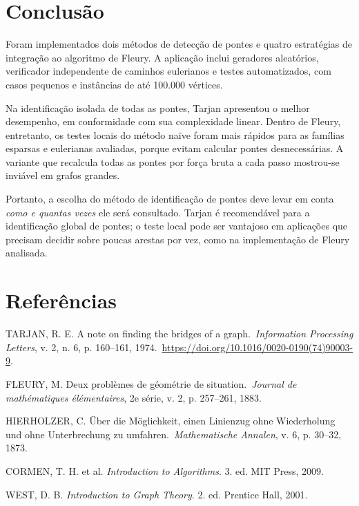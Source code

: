\documentclass[12pt,a4paper]{article}
\newcommand{\naive}{na\"ive}
\begin{document}
\section{Conclusão}
Foram implementados dois métodos de detecção de pontes e quatro
estratégias de integração ao algoritmo de Fleury. A aplicação inclui
geradores aleatórios, verificador independente de caminhos eulerianos
e testes automatizados, com casos pequenos e instâncias de até
100.000 vértices.

Na identificação isolada de todas as pontes, Tarjan apresentou o melhor
desempenho, em conformidade com sua complexidade linear. Dentro de
Fleury, entretanto, os testes locais do método \naive{} foram mais
rápidos para as famílias esparsas e eulerianas avaliadas, porque evitam
calcular pontes desnecessárias. A variante que recalcula todas as pontes
por força bruta a cada passo mostrou-se inviável em grafos grandes.

Portanto, a escolha do método de identificação de pontes deve levar
em conta \emph{como e quantas vezes} ele será consultado. Tarjan é
recomendável para a identificação global de pontes; o teste local pode
ser vantajoso em aplicações que precisam decidir sobre poucas arestas
por vez, como na implementação de Fleury analisada.

\section*{Referências}
\begin{enumerate}[label={[\arabic*]},leftmargin=1.15cm]
\item TARJAN, R. E. A note on finding the bridges of a graph.\
\emph{Information Processing Letters}, v. 2, n. 6, p. 160--161, 1974.\
\url{https://doi.org/10.1016/0020-0190(74)90003-9}.
\item FLEURY, M. Deux problèmes de géométrie de situation.\
\emph{Journal de mathématiques élémentaires}, 2e série, v. 2, p. 257--261, 1883.
\item HIERHOLZER, C. Über die Möglichkeit, einen Linienzug ohne Wiederholung und ohne Unterbrechung zu umfahren.\
\emph{Mathematische Annalen}, v. 6, p. 30--32, 1873.
\item CORMEN, T. H. et al. \emph{Introduction to Algorithms}. 3. ed. MIT Press, 2009.
\item WEST, D. B. \emph{Introduction to Graph Theory}. 2. ed. Prentice Hall, 2001.
\end{enumerate}
\end{document}
